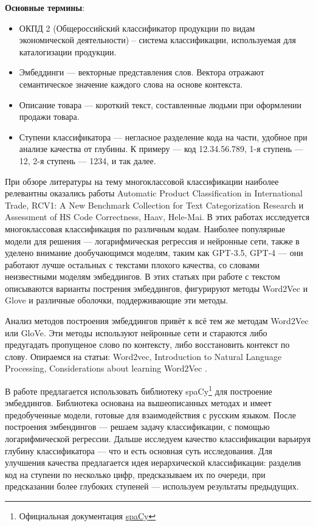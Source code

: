 \documentclass{article}
\begin{document}
\textbf{Основные термины}:
\begin{itemize}
    \item ОКПД 2 (Общероссийский классификатор продукции по видам экономической деятельности) -- система классификации, используемая для каталогизации продукции.
    \item Эмбеддинги --- векторные представления слов. Вектора отражают семантическое значение каждого слова на основе контекста.
    \item Описание товара --- короткий текст, составленные людьми при оформлении продажи товара.
    \item Ступени классификатора --- негласное разделение кода на части, удобное при анализе качества от глубины. К примеру --- код 12.34.56.789, 1-я ступень --- 12, 2-я ступень --- 1234, и так далее. 
\end{itemize}

При обзоре литературы на тему многоклассовой классификации наиболее релевантны оказались работы Automatic Product Classification in International Trade\cite{Marra2021AutomaticClassification}, RCV1: A New Benchmark Collection for Text Categorization Research\cite{Lewis2004ReutersCodes} и Assessment of HS Code Correctness, Haav, Hele-Mai\cite{Haav2021HSCodes}. В этих работах исследуется многоклассовая классификация по различным кодам. Наиболее популярные модели для решения ---  логарифмическая регрессия и нейронные сети, также в \cite{Marra2021AutomaticClassification} уделено внимание дообучающимся моделям, таким как GPT-3.5, GPT-4 --- они работают лучше остальных с текстами плохого качества, со словами неизвестными моделям эмбеддингов. В этих статьях при работе с текстом описываются варианты пострения эмбеддингов, фигурируют методы Word2Vec и Glove и различные оболочки, поддерживающие эти методы.  

Анализ методов построения эмбеддингов привёт к всё тем же методам Word2Vec  или GloVe.  Эти методы используют нейронные сети и стараются либо предугадать пропущеное слово по контексту, либо восстановить контекст по слову. Опираемся на статьи: Word2vec\cite{Church2017}, Introduction to Natural Language Processing\cite{munozWordEmbeddings}, Considerations about learning Word2Vec \cite{DiGennaro2021}.  

В работе предлагается использовать библиотеку spaCy\footnote{Официальная документация \href{https://spacy.io/}{spaCy}} для построение эмбеддингов. Библиотека основана на вышеописанных методах и имеет предобученные модели, готовые для взаимодействия с русским языком. После построения эмбендингов --- решаем задачу классификации, с помощью логарифмической регрессии. Дальше исследуем качество классификации варьируя глубину классификатора --- что и есть основная суть исследования. Для улучшения качества предлагается идея иерархической классификации: разделив код на ступени по несколько цифр, предсказываем их по очереди, при предсказании более глубоких ступеней --- используем результаты предыдущих.
\end{document}
